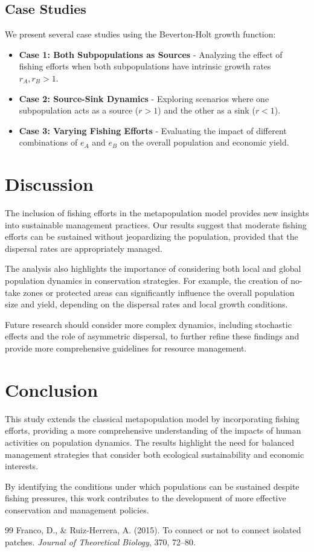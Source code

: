 \documentclass{article}
\begin{document}
\subsection{Case Studies}
We present several case studies using the Beverton-Holt growth function:
\begin{itemize}
    \item \textbf{Case 1: Both Subpopulations as Sources} - Analyzing the effect of fishing efforts when both subpopulations have intrinsic growth rates $r_A, r_B > 1$.
    \item \textbf{Case 2: Source-Sink Dynamics} - Exploring scenarios where one subpopulation acts as a source ($r > 1$) and the other as a sink ($r < 1$).
    \item \textbf{Case 3: Varying Fishing Efforts} - Evaluating the impact of different combinations of $e_A$ and $e_B$ on the overall population and economic yield.
\end{itemize}

\section{Discussion}

The inclusion of fishing efforts in the metapopulation model provides new insights into sustainable management practices. Our results suggest that moderate fishing efforts can be sustained without jeopardizing the population, provided that the dispersal rates are appropriately managed.

The analysis also highlights the importance of considering both local and global population dynamics in conservation strategies. For example, the creation of no-take zones or protected areas can significantly influence the overall population size and yield, depending on the dispersal rates and local growth conditions.

Future research should consider more complex dynamics, including stochastic effects and the role of asymmetric dispersal, to further refine these findings and provide more comprehensive guidelines for resource management.


\section{Conclusion}

This study extends the classical metapopulation model by incorporating fishing efforts, providing a more comprehensive understanding of the impacts of human activities on population dynamics. The results highlight the need for balanced management strategies that consider both ecological sustainability and economic interests.

By identifying the conditions under which populations can be sustained despite fishing pressures, this work contributes to the development of more effective conservation and management policies.

\begin{thebibliography}{99}
 Franco, D., \& Ruiz-Herrera, A. (2015). To connect or not to connect isolated patches. \textit{Journal of Theoretical Biology}, 370, 72–80.
\end{thebibliography}
\end{document}
